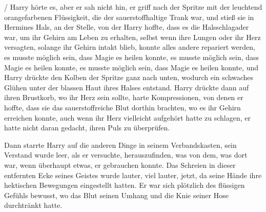  /  Harry hörte es, aber er sah nicht hin, er griff nach der Spritze mit der leuchtend orangefarbenen Flüssigkeit, die der sauerstoffhaltige Trank war, und stieß sie in Hermines Hals, an der Stelle, von der Harry hoffte, dass es die Halsschlagader war, um ihr Gehirn am Leben zu erhalten, selbst wenn ihre Lungen oder ihr Herz versagten, solange ihr Gehirn intakt blieb, konnte alles andere repariert werden, es musste möglich sein, dass Magie es heilen konnte, es musste möglich sein, dass Magie es heilen konnte, es musste möglich sein, dass Magie es heilen konnte, und Harry drückte den Kolben der Spritze ganz nach unten, wodurch ein schwaches Glühen unter der blassen Haut ihres Halses entstand. Harry drückte dann auf ihren Brustkorb, wo ihr Herz sein sollte, harte Kompressionen, von denen er hoffte, dass sie das sauerstoffreiche Blut dorthin brachten, wo es ihr Gehirn erreichen konnte, auch wenn ihr Herz vielleicht aufgehört hatte zu schlagen, er hatte nicht daran gedacht, ihren Puls zu überprüfen.

Dann starrte Harry auf die anderen Dinge in seinem Verbandskasten, sein Verstand wurde leer, als er versuchte, herauszufinden, was von dem, was dort war, wenn überhaupt etwas, er gebrauchen konnte. Das Schreien in dieser entfernten Ecke seines Geistes wurde lauter, viel lauter, jetzt, da seine Hände ihre hektischen Bewegungen eingestellt hatten. Er war sich plötzlich des flüssigen Gefühls bewusst, wo das Blut seinen Umhang und die Knie seiner Hose durchtränkt hatte.

